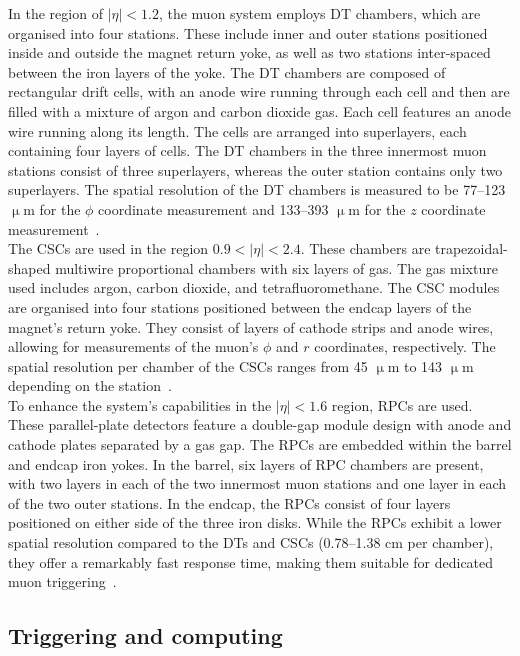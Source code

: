 In the region of $|\eta| < 1.2$, the muon system employs \ac{DT} chambers, which are organised into four stations. 
These include inner and outer stations positioned inside and outside the magnet return yoke, as well as two stations inter-spaced between the iron layers of the yoke. 
The \ac{DT} chambers are composed of rectangular drift cells, with an anode wire running through each cell and then are filled with a mixture of argon and carbon dioxide gas. 
Each cell features an anode wire running along its length. 
The cells are arranged into superlayers, each containing four layers of cells. 
The \ac{DT} chambers in the three innermost muon stations consist of three superlayers, whereas the outer station contains only two superlayers. 
The spatial resolution of the \ac{DT} chambers is measured to be 77–123 $\upmu$m for the $\phi$ coordinate measurement and 133–393 $\upmu$m for the $z$ coordinate measurement~\cite{CMS:2018rym}. \\

The \ac{CSC}s are used in the region $0.9 < |\eta| < 2.4$. 
These chambers are trapezoidal-shaped multiwire proportional chambers with six layers of gas. 
The gas mixture used includes argon, carbon dioxide, and tetrafluoromethane. 
The \ac{CSC} modules are organised into four stations positioned between the endcap layers of the magnet's return yoke. 
They consist of layers of cathode strips and anode wires, allowing for measurements of the muon's $\phi$ and $r$ coordinates, respectively. 
The spatial resolution per chamber of the \ac{CSC}s ranges from 45 $\upmu$m to 143 $\upmu$m depending on the station~\cite{CMS:2018rym}. \\

To enhance the system's capabilities in the $|\eta| < 1.6$ region, \ac{RPC}s are used. 
These parallel-plate detectors feature a double-gap module design with anode and cathode plates separated by a gas gap. 
The \ac{RPC}s are embedded within the barrel and endcap iron yokes. 
In the barrel, six layers of \ac{RPC} chambers are present, with two layers in each of the two innermost muon stations and one layer in each of the two outer stations. 
In the endcap, the \ac{RPC}s consist of four layers positioned on either side of the three iron disks. 
While the \ac{RPC}s exhibit a lower spatial resolution compared to the \ac{DT}s and \ac{CSC}s (0.78–1.38 cm per chamber), they offer a remarkably fast response time, making them suitable for dedicated muon triggering~\cite{CMS:2018rym}.

\subsection{Triggering and computing}

